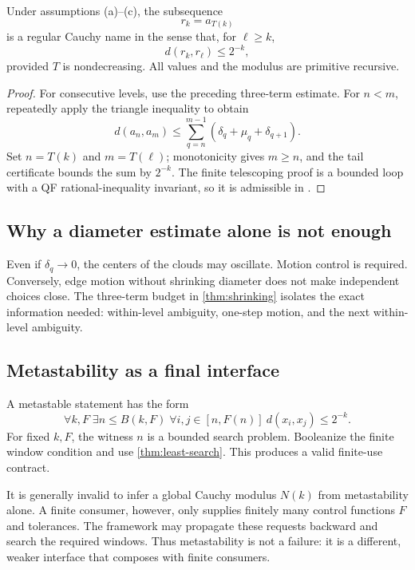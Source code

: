 \begin{theorem}\label{thm:shrinking}
Under assumptions (a)--(c), the subsequence
\[
 r_k=a_{T(k)}
\]
is a regular Cauchy name in the sense that, for \(\ell\ge k\),
\[
 d(r_k,r_\ell)\le 2^{-k},
\]
provided \(T\) is nondecreasing.  All values and the modulus are primitive recursive.
\end{theorem}

\begin{proof}
For consecutive levels, use the preceding three-term estimate.  For \(n<m\), repeatedly apply the triangle inequality to obtain
\[
 d(a_n,a_m)\le
 \sum_{q=n}^{m-1}(\delta_q+\mu_q+\delta_{q+1}).
\]
Set \(n=T(k)\) and \(m=T(\ell)\); monotonicity gives \(m\ge n\), and the tail certificate bounds the sum by \(2^{-k}\).  The finite telescoping proof is a bounded loop with a QF rational-inequality invariant, so it is admissible in \iPRA.
\end{proof}

\subsection{Why a diameter estimate alone is not enough}

Even if \(\delta_q\to0\), the centers of the clouds may oscillate.  Motion control is required.  Conversely, edge motion without shrinking diameter does not make independent choices close.  The three-term budget in \cref{thm:shrinking} isolates the exact information needed: within-level ambiguity, one-step motion, and the next within-level ambiguity.

\subsection{Metastability as a final interface}

A metastable statement has the form
\[
  \forall k,F\;\exists n\le B(k,F)\;
  \forall i,j\in[n,F(n)]\ d(x_i,x_j)\le 2^{-k}.
\]
For fixed \(k,F\), the witness \(n\) is a bounded search problem.  Booleanize the finite window condition and use \cref{thm:least-search}.  This produces a valid finite-use contract.

It is generally invalid to infer a global Cauchy modulus \(N(k)\) from metastability alone.  A finite consumer, however, only supplies finitely many control functions \(F\) and tolerances.  The framework may propagate these requests backward and search the required windows.  Thus metastability is not a failure: it is a different, weaker interface that composes with finite consumers.

